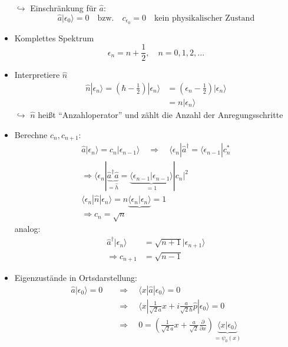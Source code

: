 \documentclass[10pt,article,colorback,accentcolor=tud9d]{scrartcl}
\begin{document}
\begin{itemize}
    $\hookrightarrow$ Einschränkung für $\hat{a}$:
    \begin{equation}
    \hat{a}|\epsilon_0\rangle=0 \quad \text{bzw.}\quad c_{\epsilon_0}=0 \quad \text{kein physikalischer Zustand}
    \end{equation}
  \item Komplettes Spektrum
    \begin{equation}
    \epsilon_n=n+\frac{1}{2},\quad n=0,1,2,...
    \end{equation}
  \item Interpretiere $\hat{n}$
    \begin{align}
    \hat{n}|\epsilon_n\rangle=\left(\hbar-\frac{1}{2}\right)|\epsilon_n\rangle&=\left(\epsilon_n-\frac{1}{2}\right)|\epsilon_n\rangle\\
    &=n|\epsilon_n\rangle
    \end{align}
    $\hookrightarrow$ $\hat{n}$ heißt "`Anzahloperator"' und zählt die Anzahl der Anregungsschritte
  \item Berechne $c_n,c_{n+1}$:
    \begin{align}
    \hat{a}|\epsilon_n\rangle=c_n|\epsilon_{n-1}\rangle\quad \Rightarrow \quad \langle\epsilon_n|\hat{a}^\dagger=\langle\epsilon_{n-1}|c_n^*\\
    \Rightarrow \langle \epsilon_n | \underbrace{\hat{a}^\dagger\hat{a}}_{=\hat{h}}=\underbrace{\langle\epsilon_{n-1}|\epsilon_{n-1}\rangle}_{=1}|c_n|^2\\
    \langle\epsilon_n|\hat{n}|\epsilon_n\rangle=n\underbrace{\langle\epsilon_n|\epsilon_n\rangle}{=1}\\
    \Rightarrow c_n=\sqrt{n}
    \end{align}
    analog:
    \begin{align}
    \hat{a}^\dagger|\epsilon_n\rangle&=\sqrt{n+1}|\epsilon_{n+1}\rangle\\
    \Rightarrow c_{n+1}&=\sqrt{n-1}
    \end{align}
  \item Eigenzustände in Ortsdarstellung:
    \begin{align}
    \hat{a}|\epsilon_0\rangle=0 \quad &\Rightarrow \quad \langle x|\hat{a}|\epsilon_0\rangle=0\\
    &\Rightarrow \quad \langle x|\frac{1}{\sqrt{2}a}\hat{x}+i\frac{a}{\sqrt{2}\hbar}\hat{p}|\epsilon_0\rangle=0\\
    &\Rightarrow \quad 0=\left(\frac{1}{\sqrt{2}a}x+\frac{a}{\sqrt{2}}\frac{\partial}{\partial x}\right)\underbrace{\langle x|\epsilon_0\rangle}_{=\psi_0(x)}\\

\end{align}
\end{itemize}
\end{document}
